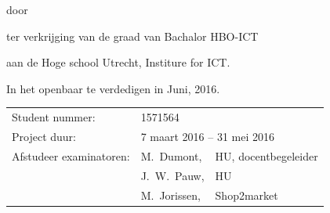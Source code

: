 \begin{titlepage}


\begin{center}


{\makeatletter
\largetitlestyle\fontsize{40}{60}\selectfont\@title
\makeatother}

{\makeatletter
\ifx\@subtitle\undefined\else
    \bigskip
   {\tudsffamily\fontsize{22}{32}\selectfont\@subtitle}    
\fi
\makeatother}

\bigskip
\bigskip

door

\bigskip
\bigskip

{\makeatletter
\largetitlestyle\fontsize{26}{26}\selectfont\@author
\makeatother}

\bigskip
\bigskip

ter verkrijging van de graad van Bachalor HBO-ICT

aan de Hoge school Utrecht, Institure for ICT.

In het openbaar te verdedigen in Juni, 2016.

\vfill

\begin{tabular}{lll}
    Student nummer: & 1571564 \\
    Project duur: & \multicolumn{2}{l}{7 maart 2016 -- 31 mei 2016} \\
    Afstudeer examinatoren:
        & M.\ Dumont, & HU, docentbegeleider \\
        & J.\ W.\ Pauw, & HU \\
        & M.\ Jorissen, & Shop2market
\end{tabular}




\end{center}


\end{titlepage}
